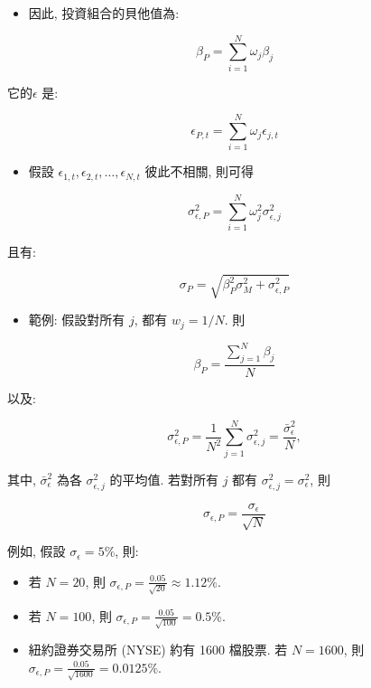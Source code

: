 \documentclass[letterpaper]{article}
\begin{document}
		\begin{itemize}
			\item 因此, 投資組合的貝他值為: 
		\end{itemize}
		
		
		$$
		\beta_{P}=\sum_{i=1}^{N} \omega_{j} \beta_{j}
		$$
		
		它的$\epsilon$ 是: 
		
		$$
		\epsilon_{P, t}=\sum_{i=1}^{N} \omega_{j} \epsilon_{j, t}
		$$
		
		\begin{itemize}
			\item 假設 $\epsilon_{1, t}, \epsilon_{2, t}, \ldots, \epsilon_{N, t}$ 彼此不相關, 則可得
		\end{itemize}
		
		
		$$
		\sigma_{\epsilon, P}^{2}=\sum_{i=1}^{N} \omega_{j}^{2} \sigma_{\epsilon, j}^{2}
		$$
		
		且有: 
		
		$$
		\sigma_{P}=\sqrt{\beta_{P}^{2} \sigma_{M}^{2}+\sigma_{\epsilon, P}^{2}}
		$$
		
		
		\begin{itemize}
			\item 範例: 假設對所有 $j$, 都有 $w_{j} = 1 / N$. 則
		\end{itemize}
		
		$$
		\beta_{P}=\frac{\sum_{j=1}^{N} \beta_{j}}{N}
		$$
		
		以及: 
		
		$$
		\sigma_{\epsilon, P}^{2}=\frac{1}{N^{2}} \sum_{j=1}^{N} \sigma_{\epsilon, j}^{2}=\frac{\bar{\sigma}_{\epsilon}^{2}}{N}, 
		$$
		
		其中, $\bar{\sigma}_{\epsilon}^{2}$ 為各 $\sigma_{\epsilon, j}^{2}$ 的平均值. 若對所有 $j$ 都有 $\sigma_{\epsilon, j}^{2} = \sigma_{\epsilon}^{2}$, 則
		
		
		$$
		\sigma_{\epsilon, P}=\frac{\sigma_{\epsilon}}{\sqrt{N}}
		$$
		
		例如, 假設 $\sigma_{\epsilon} = 5\%$, 則: 
		
		
		\begin{itemize}
			\item 若 $N = 20$, 則 $\sigma_{\epsilon, P} = \frac{0.05}{\sqrt{20}} \approx 1.12\%$. 
			\item 若 $N = 100$, 則 $\sigma_{\epsilon, P} = \frac{0.05}{\sqrt{100}} = 0.5\%$. 
			\item 紐約證券交易所 (NYSE) 約有 1600 檔股票. 若 $N = 1600$, 則 $\sigma_{\epsilon, P} = \frac{0.05}{\sqrt{1600}} = 0.0125\%$. 
		\end{itemize}
		
\end{document}
